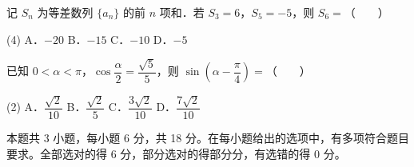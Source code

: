 \begin{question}
记 $S_n$ 为等差数列 $\{a_n\}$ 的前 $n$ 项和．若 $S_3=6$，$S_5=-5$，则 $S_6=$（　　）

\begin{gkopts}(4)
\task A．$-20$
\task B．$-15$
\task C．$-10$
\task D．$-5$
\end{gkopts}

\end{question}
\begin{question}
已知 $0<\alpha<\pi$，$\cos\dfrac{\alpha}{2}=\dfrac{\sqrt5}{5}$，则 $\sin\left(\alpha-\dfrac{\pi}{4}\right)=$（　　）

\begin{gkopts}(2)
\task A．$\dfrac{\sqrt2}{10}$
\task B．$\dfrac{\sqrt2}{5}$
\task C．$\dfrac{3\sqrt2}{10}$
\task D．$\dfrac{7\sqrt2}{10}$
\end{gkopts}

\par\medskip

\end{question}

\begin{gktip}
本题共 3 小题，每小题 6 分，共 18 分。在每小题给出的选项中，有多项符合题目要求。全部选对的得 6 分，部分选对的得部分分，有选错的得 0 分。
\end{gktip}

